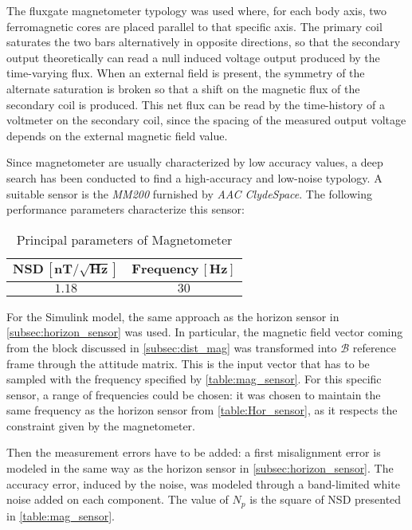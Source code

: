 The fluxgate magnetometer typology was used where, for each body axis, two ferromagnetic cores are placed parallel to that specific axis. The primary coil saturates the two bars alternatively in opposite directions, so that the secondary output theoretically can read a null induced voltage output produced 
by the time-varying flux. When an external field is present, the symmetry of the alternate saturation is broken so that a shift on the magnetic flux of the 
secondary coil is produced. This net flux can be read by the time-history of a voltmeter on the secondary coil, since the spacing of the measured output
voltage depends on the external magnetic field value. 

Since magnetometer are usually characterized by low accuracy values, a deep search has been conducted to find a high-accuracy and low-noise typology. A suitable sensor is the \textit{MM200} furnished by \textit{AAC ClydeSpace}. The following performance parameters characterize this sensor:

\begin{table}[H]

    \centering
    \begin{tabular}{|c|c|}
    \hline
     $\bm{NSD \, [nT/\sqrt{Hz}]}$ & $\bm{Frequency \, [Hz]}$ \\
    \hline
    $1.18$ & $30$  \\
    \hline
    \end{tabular}
    
    \caption{Principal parameters of Magnetometer}
    \label{table:mag_sensor}
    
\end{table}

For the Simulink model, the same approach as the horizon sensor in \autoref{subsec:horizon_sensor} was used. In particular, the magnetic field vector coming from the block discussed in \autoref{subsec:dist_mag} was transformed into $\mathcal{B}$ reference frame through the attitude matrix.
This is the input vector that has to be sampled with the frequency specified by \autoref{table:mag_sensor}. For this specific sensor, a range
of frequencies could be chosen: it was chosen to maintain the same frequency as the horizon sensor from \autoref{table:Hor_sensor}, as it respects the constraint given by the magnetometer. 

Then the measurement errors have to be added: a first misalignment error is modeled in the same way as the horizon sensor in \autoref{subsec:horizon_sensor}.
The accuracy error, induced by the noise, was modeled through a band-limited white noise added on each component. The value of $N_{p}$ is the square of NSD presented in \autoref{table:mag_sensor}.


